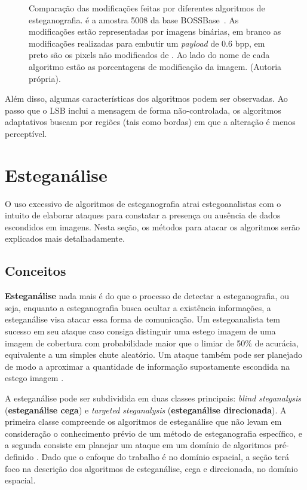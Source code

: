 \begin{figure}[h]
	\caption{Comparação das modificações feitas por diferentes algoritmos de esteganografia. \protect{} é a amostra 5008 da base BOSSBase~\cite{bas2011break}. As modificações estão representadas por imagens binárias, em branco as modificações realizadas para embutir um \textit{payload} de 0.6 bpp, em preto são os pixels não modificados de \protect{}. Ao lado do nome de cada algoritmo estão as porcentagens de modificação da imagem. (Autoria própria).}
	\label{fig:comp}
\end{figure}

Além disso, algumas características dos algoritmos podem ser observadas. Ao passo que o LSB inclui a mensagem de forma não-controlada, os algoritmos adaptativos buscam por regiões (tais como bordas) em que a alteração é menos perceptível.
\section{Esteganálise}
\label{sec:esteganálise}

O uso excessivo de algoritmos de esteganografia atrai estegoanalistas com o intuito de elaborar ataques para constatar a presença ou ausência de dados escondidos em imagens. Nesta seção, os métodos para atacar os algoritmos serão explicados mais detalhadamente.

\subsection{Conceitos}
\label{subsec:esteganalise-conc}

\textbf{Esteganálise} nada mais é do que o processo de detectar a esteganografia, ou seja, enquanto a esteganografia busca ocultar a existência informações, a esteganálise visa atacar essa forma de comunicação. Um estegoanalista tem sucesso em seu ataque caso consiga distinguir uma estego imagem de uma imagem de cobertura com probabilidade maior que o limiar de 50\% de acurácia, equivalente a um simples chute aleatório. Um ataque também pode ser planejado de modo a aproximar a quantidade de informação supostamente escondida na estego imagem \cite{fridrich2009steganography}.

 A esteganálise pode ser subdividida em duas classes principais: \textit{blind steganalysis} (\textbf{esteganálise cega}) e \textit{targeted steganalysis} (\textbf{esteganálise direcionada}). A primeira classe compreende os algoritmos de esteganálise que não levam em consideração o conhecimento prévio de um método de esteganografia específico, e a segunda consiste em planejar um ataque em um domínio de algoritmos pré-definido \cite{fridrich2009steganography}. Dado que o enfoque do trabalho é no domínio espacial, a seção terá foco na descrição dos algoritmos de esteganálise, cega e direcionada, no domínio espacial.


